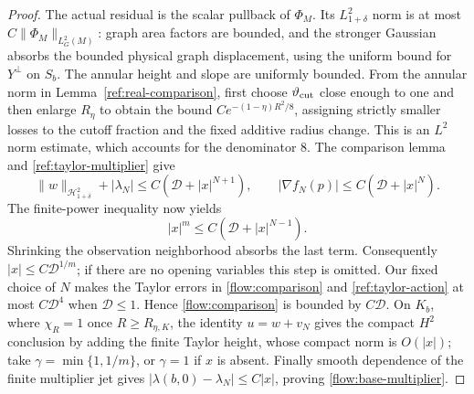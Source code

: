 \begin{proof}
The actual residual is the scalar pullback of $\Phi_M$.  Its
$L^2_{1+\delta}$ norm is at most $C\|\Phi_M\|_{L^2_G(M)}$: graph area
factors are bounded, and the stronger Gaussian absorbs the bounded
physical graph displacement, using the uniform bound for $Y^\perp$ on
$S_b$.  The annular height and slope are uniformly bounded.  From the
annular norm in Lemma~\ref{ref:real-comparison}, first choose
$\vartheta_{\rm cut}$ close enough to one and then enlarge $R_\eta$ to
obtain the bound $Ce^{-(1-\eta)R^2/8}$, assigning strictly smaller
losses to the cutoff fraction and the fixed additive radius change.
This is an $L^2$ norm estimate, which accounts for the denominator $8$.
The comparison lemma and \eqref{ref:taylor-multiplier} give
\begin{equation}\label{flow:comparison}
 \|w\|_{\mathcal H^2_{1+\delta}}+|\lambda_N|
      \le C(\mathcal D+|x|^{N+1}),\qquad
 |\nabla f_N(p)|\le C(\mathcal D+|x|^N).
\end{equation}
The finite-power inequality now yields
\[
 |x|^m\le C(\mathcal D+|x|^{N-1}).
\]
Shrinking the observation neighborhood absorbs the last term.
Consequently $|x|\le C\mathcal D^{1/m}$; if there are no opening
variables this step is omitted.  Our fixed choice of $N$ makes
the Taylor errors in \eqref{flow:comparison} and
\eqref{ref:taylor-action} at most $C\mathcal D^4$ when
$\mathcal D\le1$.  Hence \eqref{flow:comparison} is bounded by
$C\mathcal D$.  On $K_b$, where $\chi_R=1$ once $R\ge R_{\eta,K}$,
the identity $u=w+v_N$ gives the compact $H^2$ conclusion by adding
the finite Taylor height, whose compact norm is $O(|x|)$; take
$\gamma=\min\{1,1/m\}$, or $\gamma=1$ if $x$ is absent.
Finally smooth dependence of the finite multiplier jet gives
$|\lambda(b,0)-\lambda_N|\le C|x|$, proving
\eqref{flow:base-multiplier}.


\end{proof}
